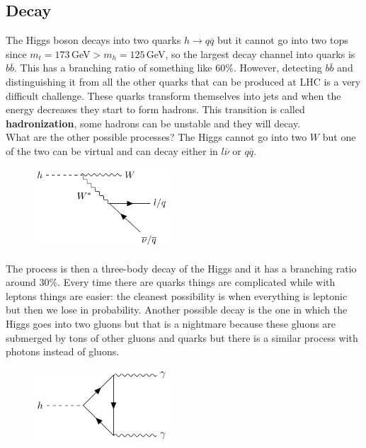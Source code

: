 \documentclass[../main.tex]{subfiles}
\begin{document}
\subsection{Decay}
The Higgs boson decays into two quarks $h\to q\overline{q}$ but it cannot go into two tops since $m_t=173$\,GeV$>m_h=125$\,GeV, so the largest decay channel into quarks is $b\overline{b}$. This has a branching ratio of something like 60\%. However, detecting $b\overline{b}$ and distinguishing it from all the other quarks that can be produced at LHC is a very difficult challenge. These quarks transform themselves into jets and when the energy decreases they start to form hadrons. This transition is called \textbf{hadronization}, some hadrons can be unstable and they will decay.\\
What are the other possible processes? The Higgs cannot go into two $W$ but one of the two can be virtual and can decay either in $l\overline{\nu}$ or $q\overline{q}$.
\begin{figure}[h]
    \centering
    \includegraphics[width=0.45\textwidth]{Images/hd1.pdf}
    \caption*{}
\end{figure}
\newpage
The process is then a three-body decay of the Higgs and it has a branching ratio around 30\%. Every time there are quarks things are complicated while with leptons things are easier: the cleanest possibility is when everything is leptonic but then we lose in probability. Another possible decay is the one in which the Higgs goes into two gluons but that is a nightmare because these gluons are submerged by tons of other gluons and quarks but there is a similar process with photons instead of gluons.
\begin{figure}[h]
    \centering
    \includegraphics[width=0.45\textwidth]{Images/hphotons.pdf}
    \caption*{}
\end{figure}\\
\end{document}
